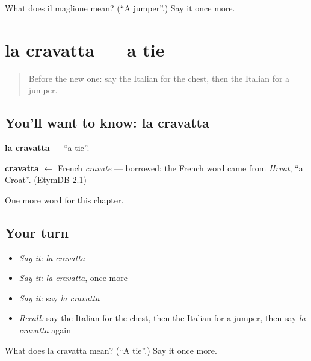 \begin{tcolorbox}[breakable,colback=teal!4,colframe=teal!35!black,title={Before you move on}]
What does il maglione mean? (\textquotedblleft{}A jumper\textquotedblright{}.) Say it once more.
\end{tcolorbox}
\section[la cravatta]{la cravatta — a tie}

\label{lesson:IT-C103-cravatta}



\begin{quote}
Before the new one: say the Italian for the chest, then the Italian for a jumper.
\end{quote}

\subsection*{You'll want to know: la cravatta}
\textbf{la cravatta} — \textquotedblleft{}a tie\textquotedblright{}.

\begin{cousinweb}
\textbf{cravatta} $\leftarrow$ French \emph{cravate} — borrowed; the French word came from \emph{Hrvat}, \textquotedblleft{}a Croat\textquotedblright{}. (EtymDB 2.1)
\end{cousinweb}

\begin{grammarlens}[title={What you've built}]
One more word for this chapter.
\end{grammarlens}

\subsection*{Your turn}
\begin{itemize}
\raggedright
  \item \emph{Say it:} \emph{la cravatta}
  \item \emph{Say it:} \emph{la cravatta}, once more
  \item \emph{Say it:} say \emph{la cravatta}
  \item \emph{Recall:} say the Italian for the chest, then the Italian for a jumper, then say \emph{la cravatta} again
\end{itemize}

\begin{tcolorbox}[breakable,colback=teal!4,colframe=teal!35!black,title={Before you move on}]
What does la cravatta mean? (\textquotedblleft{}A tie\textquotedblright{}.) Say it once more.
\end{tcolorbox}
